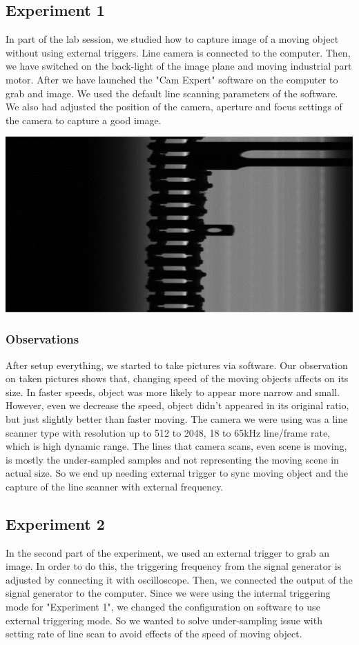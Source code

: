 \documentclass{article}
\begin{document}
	\subsection{Experiment 1}
	In part of the lab session, we studied how to capture image of a moving object without using external triggers. Line camera is connected to the computer. Then, we have switched on the back-light of the image plane and moving industrial part motor. After we have launched the "Cam Expert" software on the computer to grab and image. We used the default line scanning parameters of the software.
	We also had adjusted the position of the camera, aperture and focus settings of the camera to capture a good image.
	\begin{center}
	\includegraphics[scale=1.0]{objectPhoto.png}
	\end{center}
	\subsubsection{Observations}
	After setup everything, we started to take pictures via software. Our observation on taken pictures shows that, changing speed of the moving objects affects on its size. In faster speeds, object was more likely to appear more narrow and small. However, even we decrease the speed, object didn't appeared in its original ratio, but just slightly better than faster moving. The camera we were using was a line scanner type with resolution up to 512 to 2048, 18 to 65kHz line/frame rate, which is high dynamic range. The lines that camera scans, even scene is moving, is mostly the under-sampled samples and not representing the moving scene in actual size. So we end up needing external trigger to sync moving object and the capture of the line scanner with external frequency.
	
	\subsection{Experiment 2}
	In the second part of the experiment, we used an external trigger to grab an image. In order to do this, the triggering frequency from the signal generator is adjusted by connecting it with oscilloscope. Then, we connected the output of the signal generator to the computer. Since we were using the internal triggering mode for "Experiment 1", we changed the configuration on software to use external triggering mode. So we wanted to solve under-sampling issue with setting rate of line scan to avoid effects of the speed of moving object.
	
\end{document}
